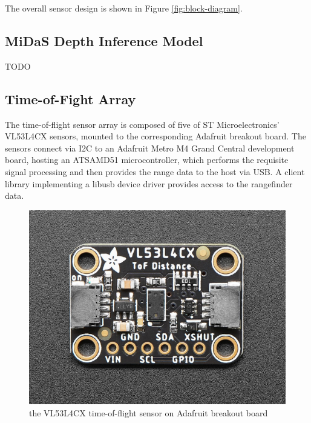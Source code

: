 \documentclass[conference]{IEEEtran}
\begin{document}
The overall sensor design is shown in Figure \ref{fig:block-diagram}.

\FloatBarrier

\subsection{MiDaS Depth Inference Model}
TODO

\FloatBarrier
\subsection{Time-of-Fight Array}
The time-of-flight sensor array is composed of five of ST Microelectronics'
VL53L4CX sensors, mounted to the corresponding Adafruit breakout board. The
sensors connect via I2C to an Adafruit Metro M4 Grand Central development
board, hosting an ATSAMD51 microcontroller, which performs the requisite signal
processing and then provides the range data to the host via USB. A client
library implementing a libusb device driver provides access to the rangefinder
data.

\begin{figure}
\centering
\includegraphics[scale=0.31]{vl53l4cx-adafruit.png}
\caption{the VL53L4CX time-of-flight sensor on Adafruit breakout board}
\label{fig:vl53l4cx}
\end{figure}
\end{document}
